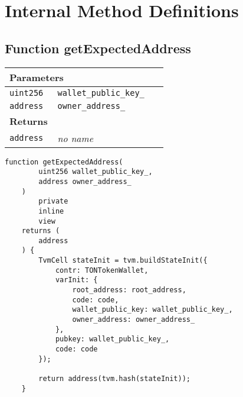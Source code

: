 \section{Internal Method Definitions}


\subsection{Function getExpectedAddress}


\ifsoltables
\noindent\begin{tabular}{|l|l|p{5cm}|}\hline
\multicolumn{3}{|l|}{\bf Parameters}\\\hline
\tt uint256 & \tt wallet\_{}public\_{}key\_{} &\\\hline
\tt address & \tt owner\_{}address\_{} &\\\hline
\multicolumn{3}{|l|}{\bf Returns}\\\hline
\tt address & {\em no name} &\\\hline
\end{tabular}
\fi

\vspace{2cm}

\begin{lstlisting}[firstnumber=620]
    function getExpectedAddress(
        uint256 wallet_public_key_,
        address owner_address_
    )
        private
        inline
        view
    returns (
        address
    ) {
        TvmCell stateInit = tvm.buildStateInit({
            contr: TONTokenWallet,
            varInit: {
                root_address: root_address,
                code: code,
                wallet_public_key: wallet_public_key_,
                owner_address: owner_address_
            },
            pubkey: wallet_public_key_,
            code: code
        });

        return address(tvm.hash(stateInit));
    }
\end{lstlisting}
